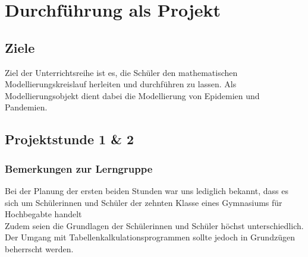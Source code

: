 \section{Durchführung als Projekt}
\subsection{Ziele}
\steffen
Ziel der Unterrichtsreihe ist es, die Schüler den mathematischen Modellierungskreislauf herleiten und durchführen zu lassen. Als Modellierungsobjekt dient dabei die Modellierung von Epidemien und Pandemien. 



\subsection{Projektstunde 1 \& 2}\ellen
\subsubsection{Bemerkungen zur Lerngruppe}
Bei der Planung der ersten beiden Stunden war uns lediglich bekannt, dass es sich um Schülerinnen und Schüler der zehnten Klasse eines Gymnasiums für Hochbegabte handelt\\
Zudem seien die Grundlagen der Schülerinnen und Schüler höchst unterschiedlich. Der Umgang mit Tabellenkalkulationsprogrammen sollte jedoch in Grundzügen beherrscht werden. 
